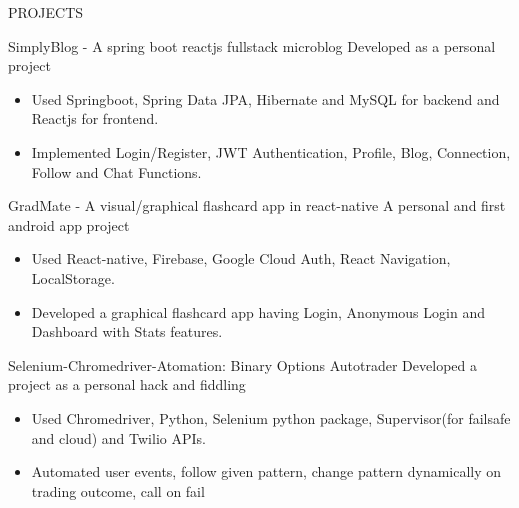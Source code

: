 \documentclass{resume} %
\begin{document}

\begin{rSection}{PROJECTS}

\begin{rSubsection}{SimplyBlog - A spring boot reactjs fullstack microblog}{\sl %
}{Developed as a personal project}{}
\begin{itemize}[noitemsep, label=\small\textbullet]
    \item Used Springboot, Spring Data JPA, Hibernate and MySQL for backend and Reactjs for frontend.
    \item Implemented Login/Register, JWT Authentication, Profile, Blog, Connection, Follow and Chat Functions.
\end{itemize}
\end{rSubsection}  


\begin{rSubsection}{GradMate - A visual/graphical flashcard app in react-native}{\sl %
}{A personal and first android app project}{}
\begin{itemize}[noitemsep,label=\small\textbullet]
\item Used React-native, Firebase, Google Cloud Auth, React Navigation, LocalStorage.
\item Developed a graphical flashcard app having Login, Anonymous Login and Dashboard with Stats features.
\end{itemize}
\end{rSubsection}

\begin{rSubsection}{Selenium-Chromedriver-Atomation: Binary Options Autotrader}{\sl %
}{Developed a project as a personal hack and fiddling}{}
\begin{itemize}[noitemsep,label=\small\textbullet]
\item Used Chromedriver, Python, Selenium python package, Supervisor(for failsafe and cloud) and Twilio APIs.
\item Automated user events, follow given pattern, change pattern dynamically on trading outcome, call on fail
\end{itemize}
\end{rSubsection}


\end{rSection} 
\end{document}
